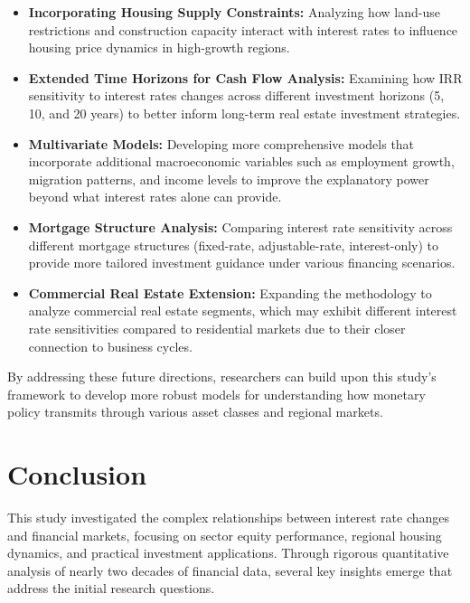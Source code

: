 \documentclass[12pt, stu, abstract]{apa7}
\begin{document}
\begin{itemize}
\item \textbf{Incorporating Housing Supply Constraints:} Analyzing how land-use restrictions and construction capacity interact with interest rates to influence housing price dynamics in high-growth regions.

\item \textbf{Extended Time Horizons for Cash Flow Analysis:} Examining how IRR sensitivity to interest rates changes across different investment horizons (5, 10, and 20 years) to better inform long-term real estate investment strategies.

\item \textbf{Multivariate Models:} Developing more comprehensive models that incorporate additional macroeconomic variables such as employment growth, migration patterns, and income levels to improve the explanatory power beyond what interest rates alone can provide.

\item \textbf{Mortgage Structure Analysis:} Comparing interest rate sensitivity across different mortgage structures (fixed-rate, adjustable-rate, interest-only) to provide more tailored investment guidance under various financing scenarios.

\item \textbf{Commercial Real Estate Extension:} Expanding the methodology to analyze commercial real estate segments, which may exhibit different interest rate sensitivities compared to residential markets due to their closer connection to business cycles.
\end{itemize}

By addressing these future directions, researchers can build upon this study's framework to develop more robust models for understanding how monetary policy transmits through various asset classes and regional markets.

\section{Conclusion}
This study investigated the complex relationships between interest rate changes and financial markets, focusing on sector equity performance, regional housing dynamics, and practical investment applications. Through rigorous quantitative analysis of nearly two decades of financial data, several key insights emerge that address the initial research questions.
\end{document}
